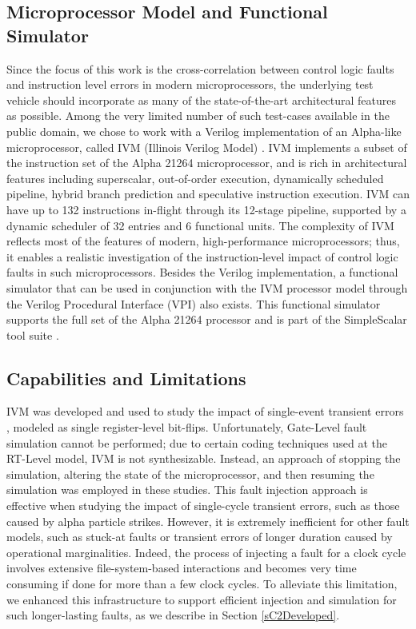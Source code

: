 \documentclass[12pt]{yalephd}
\begin{document}
\subsection{Microprocessor Model and Functional Simulator}
\label{sC2MModel}

Since the focus of this work is the cross-correlation between control logic faults and instruction level errors in modern microprocessors, the underlying test vehicle should incorporate as many of the state-of-the-art architectural features as possible. Among the very limited number of such test-cases available in the public domain, we chose to work with a Verilog implementation of an Alpha-like microprocessor, called IVM (Illinois Verilog Model) \cite{WMP07}. IVM implements a subset of the instruction set of the Alpha 21264 microprocessor, and is rich in architectural features including superscalar, out-of-order execution, dynamically scheduled pipeline, hybrid branch prediction and speculative instruction execution. IVM can have up to 132 instructions in-flight through its 12-stage pipeline, supported by a dynamic scheduler of 32 entries and 6 functional units. The complexity of IVM reflects most of the features of modern, high-performance microprocessors; thus, it enables a realistic investigation of the instruction-level impact of control logic faults in such microprocessors. Besides the Verilog implementation, a functional simulator that can be used in conjunction with the IVM processor model through the Verilog Procedural Interface (VPI) also exists. This functional simulator supports the full set of the Alpha 21264 processor and is part of the SimpleScalar tool suite \cite{BuAu97}.

\subsection{Capabilities and Limitations}

IVM was developed and used to study the impact of single-event transient errors \cite{WMP07,WaPa05,WQRP04}, modeled as single register-level bit-flips. Unfortunately, Gate-Level fault simulation cannot be performed; due to certain coding techniques used at the RT-Level model, IVM is not synthesizable. Instead, an approach of stopping the simulation, altering the state of the microprocessor, and then resuming the simulation was employed in these studies. This fault injection approach is effective when studying the impact of single-cycle transient errors, such as those caused by alpha particle strikes. However, it is extremely inefficient for other fault models, such as stuck-at faults or transient errors of longer duration caused by operational marginalities. Indeed, the process of injecting a fault for a clock cycle involves extensive file-system-based interactions and becomes very time consuming if done for more than a few clock cycles. To alleviate this limitation, we enhanced this infrastructure to support efficient injection and simulation for such longer-lasting faults, as we describe in Section \ref{sC2Developed}.
\end{document}
